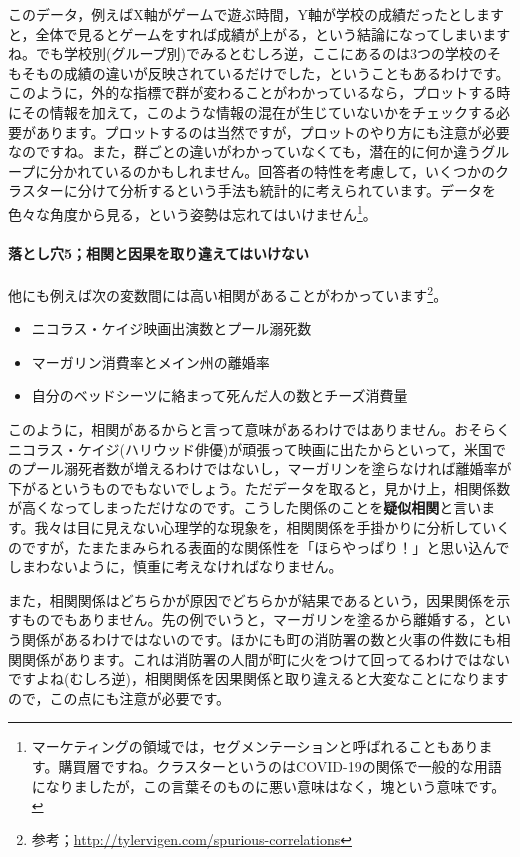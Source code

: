 \documentclass{ltjsbook}
\begin{document}
このデータ，例えばX軸がゲームで遊ぶ時間，Y軸が学校の成績だったとしますと，全体で見るとゲームをすれば成績が上がる，という結論になってしまいますね。でも学校別(グループ別)でみるとむしろ逆，ここにあるのは3つの学校のそもそもの成績の違いが反映されているだけでした，ということもあるわけです。このように，外的な指標で群が変わることがわかっているなら，プロットする時にその情報を加えて，このような情報の混在が生じていないかをチェックする必要があります。プロットするのは当然ですが，プロットのやり方にも注意が必要なのですね。また，群ごとの違いがわかっていなくても，潜在的に何か違うグループに分かれているのかもしれません。回答者の特性を考慮して，いくつかのクラスターに分けて分析するという手法も統計的に考えられています。データを色々な角度から見る，という姿勢は忘れてはいけません\footnote{マーケティングの領域では，セグメンテーションと呼ばれることもあります。購買層ですね。クラスターというのはCOVID-19の関係で一般的な用語になりましたが，この言葉そのものに悪い意味はなく，塊という意味です。}。

\paragraph{落とし穴5；相関と因果を取り違えてはいけない}
他にも例えば次の変数間には高い相関があることがわかっています\footnote{参考；\url{http://tylervigen.com/spurious-correlations}}。
\begin{itemize}
\item ニコラス・ケイジ映画出演数とプール溺死数
\item マーガリン消費率とメイン州の離婚率
\item 自分のベッドシーツに絡まって死んだ人の数とチーズ消費量
\end{itemize}

このように，相関があるからと言って意味があるわけではありません。おそらくニコラス・ケイジ(ハリウッド俳優)が頑張って映画に出たからといって，米国でのプール溺死者数が増えるわけではないし，マーガリンを塗らなければ離婚率が下がるというものでもないでしょう。ただデータを取ると，見かけ上，相関係数が高くなってしまっただけなのです。こうした関係のことを\textbf{疑似相関}と言います。我々は目に見えない心理学的な現象を，相関関係を手掛かりに分析していくのですが，たまたまみられる表面的な関係性を「ほらやっぱり！」と思い込んでしまわないように，慎重に考えなければなりません。

また，相関関係はどちらかが原因でどちらかが結果であるという，因果関係を示すものでもありません。先の例でいうと，マーガリンを塗るから離婚する，という関係があるわけではないのです。ほかにも町の消防署の数と火事の件数にも相関関係があります。これは消防署の人間が町に火をつけて回ってるわけではないですよね(むしろ逆)，相関関係を因果関係と取り違えると大変なことになりますので，この点にも注意が必要です。
\end{document}
